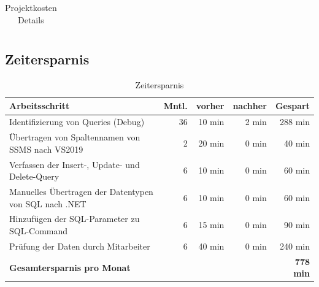 \documentclass[11pt,toc=sectionentrywithoutdots, 
headheight=44pt, headings=optiontoheadandtoc, hyperfootnotes=false, hypertexnames=false]{scrartcl}
\begin{document}
\begin{center}
\begin{table}[ht]
\begin{tabular}{|| p{27mm} | p{23mm} | r | r | r | r | r ||}
			\end{tabular}
			\caption{Projektkosten Details}
			\end{table}
			\end{center}
			
				
			
	
	
		
		



\subsection{Zeitersparnis}
	\label{sec:Zeitersparnis}
\begin{table}[ht]
\centering
		\begin{tabular}{|| l | r | r | r | r ||}
	    \hline
	    
		\textbf{Arbeitsschritt}                                     & \textbf{Mntl.} &\textbf{vorher} & \textbf{nachher} &\textbf{Gespart}\\
		\hline
		Identifizierung von Queries (Debug)                         & 36        & 10 min         & 2 min	         & 288 min\\
		Übertragen von Spaltennamen von SSMS nach VS2019            & 2         & 20 min         & 0 min	         & 40 min\\
		Verfassen der Insert-, Update- und Delete-Query             & 6         & 10 min         & 0 min	         & 60 min\\
		Manuelles Übertragen der Datentypen von SQL nach .NET       & 6         & 10 min         & 0 min	         & 60 min\\
		Hinzufügen der SQL-Parameter zu SQL-Command                 & 6         & 15 min         & 0 min	         & 90 min\\
		Prüfung der Daten durch Mitarbeiter                         & 6         & 40 min         & 0 min	         & 240 min\\
		\hline		
		\multicolumn{4}{||l|}{\textbf{Gesamtersparnis pro Monat}}                                                &\textbf{778 min}\\
		\hline
		
		
			\end{tabular}
			\caption{Zeitersparnis}
			\end{table}
			

\clearpage
\end{document}

